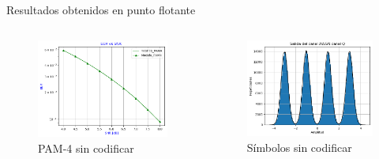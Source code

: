 \documentclass[xcolor=table]{beamer}
\begin{document}
\begin{frame}{Resultados obtenidos en punto flotante}
\begin{columns}
    \begin{column}{0.49\paperwidth}
    \small 
    \begin{figure}
        \centering
        \includegraphics[width=\textwidth]{Graficos/BER_vs_SNR_1.png}%
        \caption{PAM-4 sin codificar}
        \label{fig:my_label}
    \end{figure}
    
    \end{column}
    \begin{column}{0.48\paperwidth}  
    \begin{figure}
        \centering
        \includegraphics[width=\textwidth]{Graficos/AWGN_symbols.png}
        \caption{Símbolos sin codificar}
        \label{fig:my_label}
    \end{figure}
    
    \end{column}
\end{columns}
\end{frame}
\end{document}
